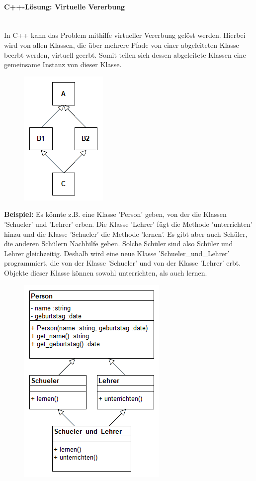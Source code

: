 			\paragraph{C++-Lösung: Virtuelle Vererbung}\mbox{}\\
				In C++ kann das Problem mithilfe virtueller Vererbung gelöst werden. Hierbei wird von allen Klassen, die über
				mehrere Pfade von einer abgeleiteten Klasse beerbt werden, virtuell geerbt. Somit teilen sich dessen
				abgeleitete Klassen eine gemeinsame Instanz von dieser Klasse.
				\begin{figure}[H]
					\includegraphics[scale=0.75]{vererbung/mehrfach/diamond/virtuell.png}
				\end{figure}
				
				{\bfseries Beispiel:}
					Es könnte z.B. eine Klasse 'Person' geben, von der die Klassen 'Schueler' und 'Lehrer' erben. Die Klasse
					'Lehrer' fügt die Methode 'unterrichten' hinzu und die Klasse 'Schueler' die Methode 'lernen'. Es gibt aber
					auch Schüler, die anderen Schülern Nachhilfe geben. Solche Schüler sind also Schüler und Lehrer
					gleichzeitig. Deshalb wird eine neue Klasse 'Schueler\_und\_Lehrer' programmiert, die von der Klasse
					'Schueler' und von der Klasse 'Lehrer' erbt. Objekte dieser Klasse können sowohl unterrichten, als auch
					lernen.
					\begin{figure}[H]
						\includegraphics[scale=0.75]{vererbung/mehrfach/diamond/beispiele/schueler_lehrer/schueler_lehrer.png}
					\end{figure}
					
